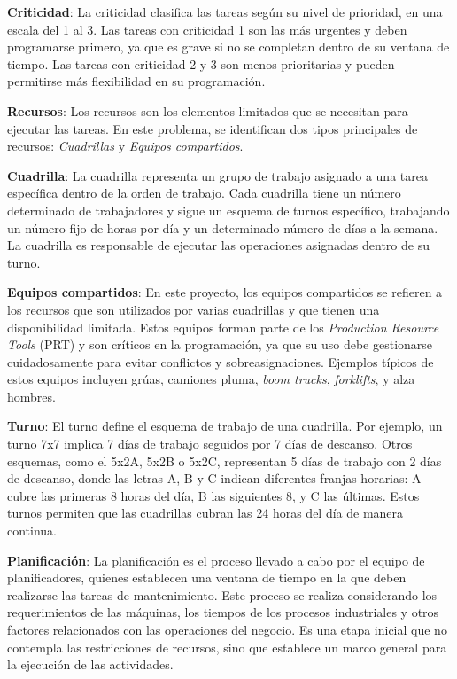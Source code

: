 \documentclass{article}
\begin{document}
\textbf{Criticidad}: La criticidad clasifica las tareas según su nivel de prioridad, en una escala del 1 al 3. Las tareas con criticidad 1 son las más urgentes y deben programarse primero, ya que es grave si no se completan dentro de su ventana de tiempo. Las tareas con criticidad 2 y 3 son menos prioritarias y pueden permitirse más flexibilidad en su programación.

\textbf{Recursos}: Los recursos son los elementos limitados que se necesitan para ejecutar las tareas. En este problema, se identifican dos tipos principales de recursos: \textit{Cuadrillas} y \textit{Equipos compartidos}.

\textbf{Cuadrilla}: La cuadrilla representa un grupo de trabajo asignado a una tarea específica dentro de la orden de trabajo. Cada cuadrilla tiene un número determinado de trabajadores y sigue un esquema de turnos específico, trabajando un número fijo de horas por día y un determinado número de días a la semana. La cuadrilla es responsable de ejecutar las operaciones asignadas dentro de su turno.

\textbf{Equipos compartidos}: En este proyecto, los equipos compartidos se refieren a los recursos que son utilizados por varias cuadrillas y que tienen una disponibilidad limitada. Estos equipos forman parte de los \textit{Production Resource Tools} (PRT) y son críticos en la programación, ya que su uso debe gestionarse cuidadosamente para evitar conflictos y sobreasignaciones. Ejemplos típicos de estos equipos incluyen grúas, camiones pluma, \textit{boom trucks}, \textit{forklifts}, y alza hombres.

\textbf{Turno}: El turno define el esquema de trabajo de una cuadrilla. Por ejemplo, un turno 7x7 implica 7 días de trabajo seguidos por 7 días de descanso. Otros esquemas, como el 5x2A, 5x2B o 5x2C, representan 5 días de trabajo con 2 días de descanso, donde las letras A, B y C indican diferentes franjas horarias: A cubre las primeras 8 horas del día, B las siguientes 8, y C las últimas. Estos turnos permiten que las cuadrillas cubran las 24 horas del día de manera continua.

\textbf{Planificación}: La planificación es el proceso llevado a cabo por el equipo de planificadores, quienes establecen una ventana de tiempo en la que deben realizarse las tareas de mantenimiento. Este proceso se realiza considerando los requerimientos de las máquinas, los tiempos de los procesos industriales y otros factores relacionados con las operaciones del negocio. Es una etapa inicial que no contempla las restricciones de recursos, sino que establece un marco general para la ejecución de las actividades.
\end{document}

